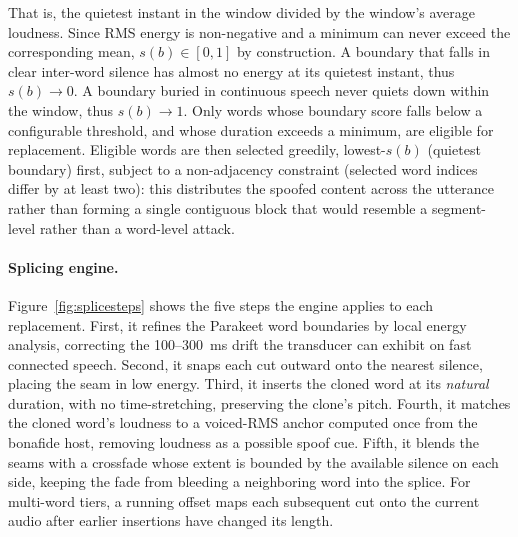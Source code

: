 \documentclass[11pt]{article}
\begin{document}
That is, the quietest instant in the window divided by the window's
average loudness. Since RMS energy is non-negative and a minimum can
never exceed the corresponding mean, $s(b) \in [0,1]$ by construction. A
boundary that falls in clear inter-word silence has almost no energy at
its quietest instant, thus $s(b) \to 0$. A boundary buried in continuous
speech never quiets down within the window, thus $s(b) \to 1$. Only
words whose boundary score falls below a configurable threshold, and
whose duration exceeds a minimum, are eligible for replacement. Eligible
words are then selected greedily, lowest-$s(b)$ (quietest boundary)
first, subject to a non-adjacency constraint (selected word indices
differ by at least two): this distributes the spoofed content across
the utterance rather than forming a single contiguous block that would
resemble a segment-level rather than a word-level attack.

\paragraph{Splicing engine.} Figure~\ref{fig:splicesteps} shows the five
steps the engine applies to each replacement. First, it refines the
Parakeet word boundaries by local energy analysis, correcting the
100--\SI{300}{\milli\second} drift the transducer can exhibit on fast
connected speech. Second, it snaps each cut outward onto the nearest
silence, placing the seam in low energy. Third, it inserts the cloned
word at its \emph{natural} duration, with no time-stretching, preserving
the clone's pitch. Fourth, it matches the cloned word's loudness to a
voiced-RMS anchor computed once from the bonafide host, removing loudness
as a possible spoof cue. Fifth, it blends the seams with a
crossfade whose extent is bounded by the available silence on each side,
keeping the fade from bleeding a neighboring word into the splice. For
multi-word tiers, a running offset maps each subsequent cut onto the
current audio after earlier insertions have changed its length.
\end{document}
